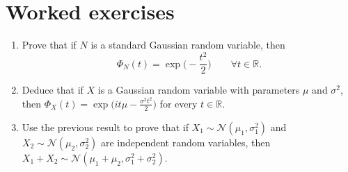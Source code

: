 \section{Worked exercises}\label{sec:cf-worked}

\begin{example}\label{exa:cf-gaussian}
\leavevmode
\begin{enumerate}[label=\alph*)]
  \item Prove that if $N$ is a standard Gaussian random variable, then
    \[
      \Phi_N(t)=\exp\Big(-\frac{t^2}2\Big)\qquad\forall t\in\mathbb R .
    \]
  \item Deduce that if $X$ is a Gaussian random variable with parameters $\mu$ and $\sigma^2$, then
    $\Phi_X(t)=\exp\big(it\mu-\frac{\sigma^2t^2}2\big)$ for every $t\in\mathbb R$.
  \item Use the previous result to prove that if $X_1\sim\mathcal N(\mu_1,\sigma_1^2)$ and
    $X_2\sim\mathcal N(\mu_2,\sigma_2^2)$ are independent random variables, then
    $X_1+X_2\sim\mathcal N(\mu_1+\mu_2,\sigma_1^2+\sigma_2^2)$.
\end{enumerate}


\end{example}
